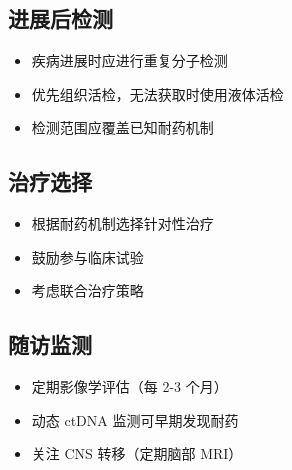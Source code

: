 \documentclass[12pt,a4paper]{article}
\begin{document}
\subsection*{进展后检测}
\begin{itemize}
    \item 疾病进展时应进行重复分子检测
    \item 优先组织活检，无法获取时使用液体活检
    \item 检测范围应覆盖已知耐药机制
\end{itemize}

\subsection*{治疗选择}
\begin{itemize}
    \item 根据耐药机制选择针对性治疗
    \item 鼓励参与临床试验
    \item 考虑联合治疗策略
\end{itemize}

\subsection*{随访监测}
\begin{itemize}
    \item 定期影像学评估（每 2-3 个月）
    \item 动态 ctDNA 监测可早期发现耐药
    \item 关注 CNS 转移（定期脑部 MRI）
\end{itemize}
\end{document}
